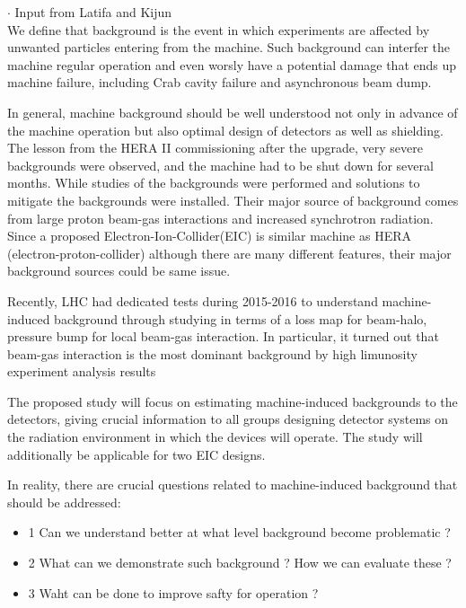 
$\cdot$ Input from Latifa and Kijun\\

We define that background is the event in which experiments are affected by unwanted particles entering from the machine.
Such background can interfer the machine regular operation and even worsly have a potential damage that ends up machine
failure, including Crab cavity failure and asynchronous beam dump.


In general, machine background should be well understood not only in advance of the machine operation but also optimal
design of detectors as well as shielding. The lesson from the HERA II commissioning after the upgrade, very severe
backgrounds were observed, and the machine had to be shut down for several months. While studies of the backgrounds
were performed and solutions to mitigate the backgrounds were installed. Their major source of background comes from
large proton beam-gas interactions and increased synchrotron radiation. Since a proposed Electron-Ion-Collider(EIC)
is similar machine as HERA (electron-proton-collider) although there are many different features, their major background
sources could be same issue.


Recently, LHC had dedicated tests during 2015-2016 to understand machine-induced background through studying in terms of
a loss map for beam-halo, pressure bump for local beam-gas interaction. In particular, it turned out that beam-gas interaction
is the most dominant background by high limunosity experiment analysis results 


The proposed study will focus on estimating machine-induced backgrounds to the detectors, giving crucial information
to all groups designing detector systems on the radiation environment in which the devices will operate. The study
will additionally be applicable for two EIC designs.



In reality, there are crucial questions related to machine-induced background that should be addressed:
\begin{itemize}
\item{1} Can we understand better at what level background become problematic ?
\item{2} What can we demonstrate such background ? How we can evaluate these ?
\item{3} Waht can be done to improve safty for operation ?
\end{itemize}



